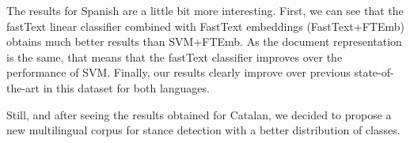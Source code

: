\documentclass[10pt, a4paper]{article}
\begin{document}
The results for Spanish are a little bit more interesting. First, we can see that the fastText linear classifier combined with FastText embeddings (FastText+FTEmb) obtains much better results than SVM+FTEmb. As the document representation is the same, that means that the fastText classifier \cite{joulin-etal-2017-bag} improves over the performance of SVM. Finally, our results clearly improve over previous state-of-the-art in this dataset for both languages.

Still, and after seeing the results obtained for Catalan, we decided to propose a new multilingual corpus for stance detection with a better distribution of classes.



\end{document}
